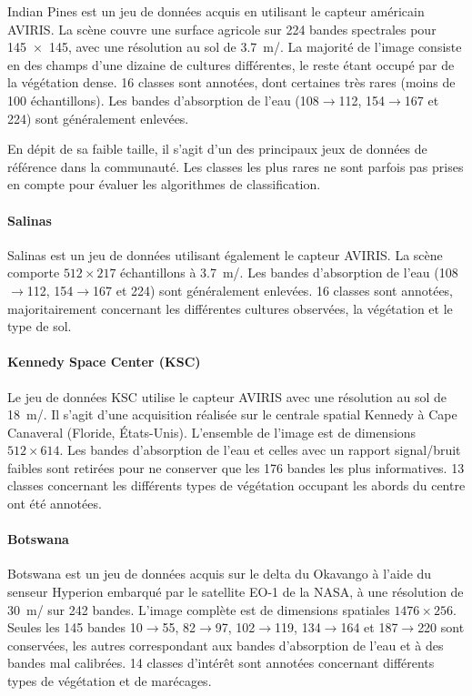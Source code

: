 Indian Pines est un jeu de données acquis en utilisant le capteur américain \gls{AVIRIS}. La scène couvre une surface agricole sur 224 bandes spectrales pour \SI{145x145}{\px}, avec une résolution au sol de \SI{3,7}{\meter/\px}. La majorité de l'image consiste en des champs d'une dizaine de cultures différentes, le reste étant occupé par de la végétation dense. 16 classes sont annotées, dont certaines très rares (moins de 100 échantillons). Les bandes d'absorption de l'eau (108$\rightarrow$112, 154$\rightarrow$167 et 224) sont généralement enlevées.

En dépit de sa faible taille, il s'agit d'un des principaux jeux de données de référence dans la communauté. Les classes les plus rares ne sont parfois pas prises en compte pour évaluer les algorithmes de classification.

\paragraph{Salinas}
Salinas est un jeu de données utilisant également le capteur \gls{AVIRIS}. La scène comporte $512\times217$ échantillons à \SI{3,7}{\meter/\px}. Les bandes d'absorption de l'eau (108$\rightarrow$112, 154$\rightarrow$167 et 224) sont généralement enlevées. 16 classes sont annotées, majoritairement concernant les différentes cultures observées, la végétation et le type de sol.

\paragraph{Kennedy Space Center (KSC)}
Le jeu de données KSC utilise le capteur \gls{AVIRIS} avec une résolution au sol de \SI{18}{\meter/\px}. Il s'agit d'une acquisition réalisée sur le centrale spatial Kennedy à Cape Canaveral (Floride, États-Unis). L'ensemble de l'image est de dimensions $512\times614$. Les bandes d'absorption de l'eau et celles avec un rapport signal/bruit faibles sont retirées pour ne conserver que les 176 bandes les plus informatives. 13 classes concernant les différents types de végétation occupant les abords du centre ont été annotées.

\paragraph{Botswana}
Botswana est un jeu de données acquis sur le delta du Okavango à l'aide du senseur Hyperion embarqué par le satellite EO-1 de la NASA, à une résolution de \SI{30}{\meter/\px} sur 242 bandes. L'image complète est de dimensions spatiales $1476\times256$. Seules les 145 bandes 10$\rightarrow$55, 82$\rightarrow$97, 102$\rightarrow$119, 134$\rightarrow$164 et 187$\rightarrow$220 sont conservées, les autres correspondant aux bandes d'absorption de l'eau et à des bandes mal calibrées. 14 classes d'intérêt sont annotées concernant différents types de végétation et de marécages.

